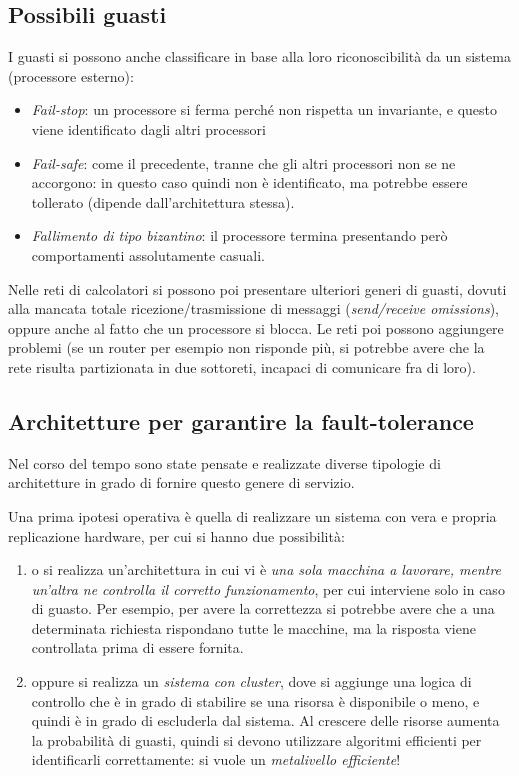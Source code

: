 \subsection{Possibili guasti}
I guasti si possono anche classificare in base alla loro riconoscibilità da un
sistema (processore esterno):
\begin{itemize}
 \item \textit{Fail-stop}: un processore si ferma perché non rispetta un
 invariante, e questo viene identificato dagli  altri processori
 \item \textit{Fail-safe}: come il precedente, tranne che gli altri processori
 non se ne accorgono: in questo caso quindi non è identificato, ma potrebbe
essere tollerato (dipende dall'architettura stessa).
 \item \textit{Fallimento di tipo bizantino}: il processore termina presentando
però comportamenti assolutamente casuali.
\end{itemize}
Nelle reti di calcolatori si possono poi presentare ulteriori generi di guasti,
dovuti alla mancata totale ricezione/trasmissione di messaggi
(\textit{send/receive omissions}), oppure anche al fatto che un processore si
blocca. Le reti poi possono aggiungere problemi (se un router per esempio non 
risponde più, si potrebbe avere che la
rete risulta partizionata in due sottoreti, incapaci di comunicare fra di loro).
\subsection{Architetture per garantire la fault-tolerance}
Nel corso del tempo sono state pensate e realizzate diverse tipologie di 
architetture in grado di fornire questo genere
di servizio.

Una prima ipotesi operativa è quella di realizzare un sistema con vera e 
propria replicazione hardware, per cui si
hanno due possibilità:
\begin{enumerate}
 \item o si realizza un'architettura in cui vi è \textit{una sola macchina a
 lavorare, mentre un'altra ne controlla il corretto  funzionamento}, per cui
 interviene solo in caso di guasto. Per esempio, per avere la correttezza si
 potrebbe  avere che a una determinata richiesta rispondano tutte le macchine,
 ma la risposta viene controllata prima di essere fornita.
 \item oppure si realizza un \textit{sistema con cluster}, dove si aggiunge una
 logica di controllo che è in grado di stabilire se una risorsa è disponibile o
 meno, e  quindi è in grado di escluderla dal sistema. Al crescere delle risorse
 aumenta la probabilità di guasti, quindi si devono utilizzare algoritmi
 efficienti per identificarli correttamente: si vuole un \textit{metalivello
 efficiente}!
\end{enumerate}

